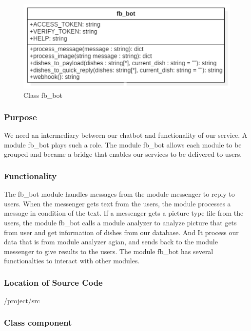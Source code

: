 \begin{figure}[htbp]
\centerline{\includegraphics[width=\linewidth]{./pictures/class_fb_bot}}
\caption{Class fb\_bot}
\label{fig:class_fb_bot}
\end{figure}
\FloatBarrier


\subsubsection {Purpose}

We need an intermediary between our chatbot and functionality of our service. A module fb\_bot plays such a role. The module fb\_bot allows each module to be grouped and became a bridge that enables our services to be delivered to users.


\subsubsection {Functionality}

The fb\_bot module handles messages from the module messenger to reply to users. When the messenger gets text from the users, the module processes a message in condition of the text. If a messenger gets a picture type file from the users, the module fb\_bot calls a module analyzer to analyze picture that gets from user and get information of dishes from our database. And It process our data that is from module analyzer agian, and sends back to the module messenger to give results to the users. The module fb\_bot has several functionalties to interact with other modules.


\subsubsection {Location of Source Code}

/project/src


\subsubsection {Class component}

